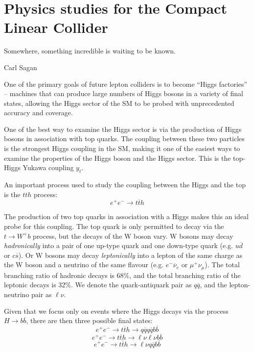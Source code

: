 \chapter{Physics studies for the Compact Linear Collider}
\label{chapter:analysis}

\epigraph{Somewhere, something incredible is waiting to be known.}{Carl Sagan}

One of the primary goals of future lepton colliders is to become ``Higgs factories'' -- machines that can produce large numbers of Higgs bosons in a variety of final states, allowing the Higgs sector of the \acrlong{SM} to be probed with unprecedented accuracy and coverage.

One of the best way to examine the Higgs sector is via the production of Higgs bosons in association with top quarks. The coupling between these two particles is the strongest Higgs coupling in the \acrshort{SM}, making it one of the easiest ways to examine the properties of the Higgs boson and the Higgs sector. This is the top-Higgs Yukawa coupling $y_t$.

An important process used to study the coupling between the Higgs and the top is the $tth$ process:
$$
e^+ e^- \rightarrow t\overline{t}h
$$

The production of two top quarks in association with a Higgs makes this an ideal probe for this coupling. The top quark is only permitted to decay via the $t \rightarrow W^+ b $ process, but the decays of the W boson vary. W bosons may decay \textit{hadronically} into a pair of one up-type quark and one down-type quark (e.g. $u\overline{d}$ or $c\overline{s}$). Or W bosons may decay \textit{leptonically} into a lepton of the same charge as the W boson and a neutrino of the same flavour (e.g. $e^- \overline{\nu}_e$ or $\mu^+ \nu_\mu$). The total branching ratio of hadronic decays is 68\%, and the total branching ratio of the leptonic decays is 32\%. We denote the quark-antiquark pair as $q\overline{q}$, and the lepton-neutrino pair as $\ell \nu$.

Given that we focus only on events where the Higgs decays via the process $H \rightarrow b\overline{b}$, there are then three possible final states:
$$
e^+ e^- \rightarrow t\overline{t}h \rightarrow q\overline{q}q\overline{q}b\overline{b}
$$
$$
e^+ e^- \rightarrow t\overline{t}h \rightarrow \ell \nu \ell \nu b \overline{b}
$$
$$
e^+ e^- \rightarrow t\overline{t}h \rightarrow \ell \nu q \overline{q} b \overline{b}
$$

